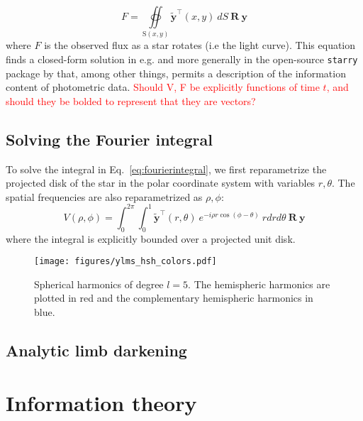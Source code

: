 \documentclass[modern]{aastex631}
\begin{document}
\begin{equation} \label{eq:fluxintegral}
   F = \oiint\limits_{\mathrm{S}(x,y)} \mathbf{\tilde{y}}^\top(x,y) \ dS \ \mathbf{R} \ \mathbf{y}
\end{equation}
where $F$ is the observed flux as a star rotates (i.e the light curve). This equation finds a closed-form solution in e.g. \citep{cowan2013} and more generally in the open-source \texttt{starry} package by \citep{starry2019} that, among other things, permits a description of the information content of photometric data.
\textcolor{red}{Should V, F be explicitly functions of time $t$, and should they be bolded to represent that they are vectors?}
\subsection{Solving the Fourier integral}

To solve the integral in Eq.~\ref{eq:fourierintegral}, we first reparametrize the projected disk of the star in the polar coordinate system with variables $r, \theta$. The spatial frequencies are also reparametrized as $\rho, \phi$:
\begin{equation} \label{eq:polarform}
   V(\rho,\phi) = \int_{0}^{2\pi}\int_{0}^{1} \mathbf{\tilde{y}}^\top(r, \theta) \ e^{-i\rho r\cos{(\phi-\theta)}} \ r dr d\theta \ \mathbf{R} \ \mathbf{y}
\end{equation} 
where the integral is explicitly bounded over a projected unit disk.



\begin{figure}[ht!]
    \begin{centering}
        \texttt{[image: figures/ylms\_hsh\_colors.pdf]}
        \caption{
        Spherical harmonics of degree $l=5$. The hemispheric harmonics are plotted in red and the complementary hemispheric harmonics in blue.
        }
        \label{fig:pyramid}
    \end{centering}
\end{figure}

\subsection{Analytic limb darkening}

\section{Information theory}
\label{sec:infotheory}
\end{document}
